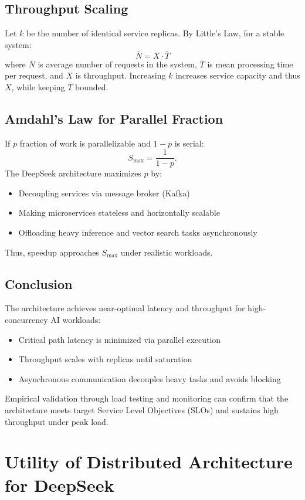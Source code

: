 \documentclass[a4paper,11pt]{article}
\begin{document}
\subsection{Throughput Scaling}

Let $k$ be the number of identical service replicas. By Little's Law, for a stable system:
\[
\bar{N} = X \cdot \bar{T}
\]
where $\bar{N}$ is average number of requests in the system, $\bar{T}$ is mean processing time per request, and $X$ is throughput. Increasing $k$ increases service capacity and thus $X$, while keeping $\bar{T}$ bounded.

\subsection{Amdahl's Law for Parallel Fraction}

If $p$ fraction of work is parallelizable and $1-p$ is serial:
\[
S_{\max} = \frac{1}{1-p}.
\]
The DeepSeek architecture maximizes $p$ by:
\begin{itemize}
  \item Decoupling services via message broker (Kafka)
  \item Making microservices stateless and horizontally scalable
  \item Offloading heavy inference and vector search tasks asynchronously
\end{itemize}
Thus, speedup approaches $S_{\max}$ under realistic workloads.

\subsection{Conclusion}

The architecture achieves near-optimal latency and throughput for high-concurrency AI workloads:
\begin{itemize}
  \item Critical path latency is minimized via parallel execution
  \item Throughput scales with replicas until saturation
  \item Asynchronous communication decouples heavy tasks and avoids blocking
\end{itemize}
Empirical validation through load testing and monitoring can confirm that the architecture meets target Service Level Objectives (SLOs) and sustains high throughput under peak load.
\section{Utility of Distributed Architecture for DeepSeek}
\end{document}
